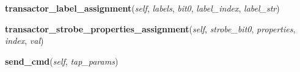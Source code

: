     \label{hpl_tap_engine:HplTapEngine:transactor_label_assignment}

    \vspace{0.5ex}

\hspace{.8\funcindent}\begin{boxedminipage}{\funcwidth}

    \raggedright \textbf{transactor\_label\_assignment}(\textit{self}, \textit{labels}, \textit{bit0}, \textit{label\_index}, \textit{label\_str})

\setlength{\parskip}{2ex}
\setlength{\parskip}{1ex}
    \end{boxedminipage}

    \label{hpl_tap_engine:HplTapEngine:transactor_strobe_properties_assignment}

    \vspace{0.5ex}

\hspace{.8\funcindent}\begin{boxedminipage}{\funcwidth}

    \raggedright \textbf{transactor\_strobe\_properties\_assignment}(\textit{self}, \textit{strobe\_bit0}, \textit{properties}, \textit{index}, \textit{val})

\setlength{\parskip}{2ex}
\setlength{\parskip}{1ex}
    \end{boxedminipage}

    \label{hpl_tap_engine:HplTapEngine:send_cmd}

    \vspace{0.5ex}

\hspace{.8\funcindent}\begin{boxedminipage}{\funcwidth}

    \raggedright \textbf{send\_cmd}(\textit{self}, \textit{tap\_params})

\setlength{\parskip}{2ex}
\setlength{\parskip}{1ex}
    \end{boxedminipage}


